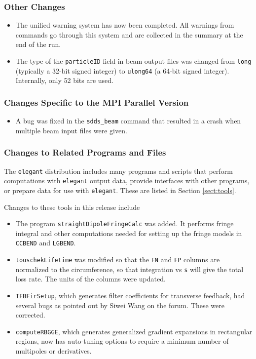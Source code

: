 \documentclass[11pt]{article}
\begin{document}
\subsubsection{Other Changes}

\begin{itemize}
\item The unified warning system has now been completed. All warnings from commands go through this
  system and are collected in the summary at the end of the run.
\item The type of the \verb|particleID| field in beam output files was changed from \verb|long| (typically
  a 32-bit signed integer) to \verb|ulong64| (a 64-bit signed integer). Internally, only 52 bits are used.
\end{itemize}

\subsubsection{Changes Specific to the MPI Parallel Version}

\begin{itemize}
\item A bug was fixed in the \verb|sdds_beam| command that resulted in a crash when multiple beam input files
  were given.
\end{itemize}

\subsubsection{Changes to Related Programs and Files}

The {\tt elegant} distribution includes many programs and scripts that perform computations with {\tt elegant}
output data, provide interfaces with other programs, or prepare data for use with {\tt elegant}. These
are listed in Section \ref{sect:tools}. 

Changes to these tools in this release include
\begin{itemize}
\item The program \verb|straightDipoleFringeCalc| was added. It performs fringe integral and other computations 
  needed for setting up the fringe models in \verb|CCBEND| and \verb|LGBEND|.
\item \verb|touschekLifetime| was modified so that the \verb|FN| and \verb|FP| columns are normalized to the
  circumference, so that integration vs \verb|s| will give the total loss rate. The units of the columns were
  updated.
\item \verb|TFBFirSetup|, which generates filter coefficients  for transverse  feedback, had several bugs 
  as pointed out by Siwei Wang on the forum. These were corrected.
\item \verb|computeRBGGE|, which generates generalized gradient expansions in rectangular regions, now has auto-tuning
  options to require a minimum number of multipoles or derivatives.
\end{itemize}
\end{document}
